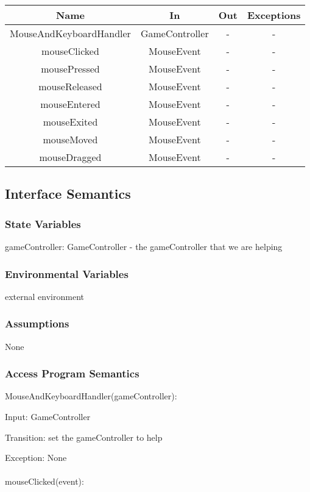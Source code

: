 \documentclass[12,english]{article}
\begin{document}
	\begin{tabular}[pos]{|c|c|c|c|}
	\hline
	\textbf{Name}& \textbf{In} & \textbf{Out} & \textbf{Exceptions} \\ 
	\hline
	MouseAndKeyboardHandler & GameController & - & - \\ \hline
	mouseClicked & MouseEvent & - & - \\ \hline
	mousePressed & MouseEvent & - & - \\ \hline
	mouseReleased & MouseEvent & - & - \\ \hline
	mouseEntered & MouseEvent & - & - \\ \hline
	mouseExited & MouseEvent & - & - \\ \hline
	mouseMoved & MouseEvent & - & - \\ \hline
	mouseDragged & MouseEvent & - & - \\ \hline
					
	\end{tabular}		
		
	\subsection{Interface Semantics}
		\subsubsection{State Variables}
		gameController: GameController - the gameController that we are helping
		\subsubsection{Environmental Variables}
		\color{red} external environment \color{black}
		\subsubsection{Assumptions}
        None

		\subsubsection{Access Program Semantics}
		MouseAndKeyboardHandler(gameController):
		
		Input: GameController
		
		Transition: set the gameController to help
		
		Exception: None\\
		\\
		mouseClicked(event):
		
\end{document}
